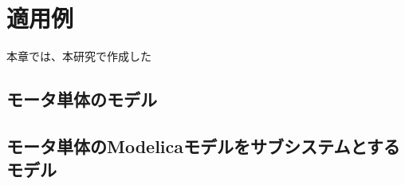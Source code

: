 \chapter{適用例}\label{cha:Indication}
本章では、本研究で作成した


\section{モータ単体のモデル}


\section{モータ単体のModelicaモデルをサブシステムとするモデル}
